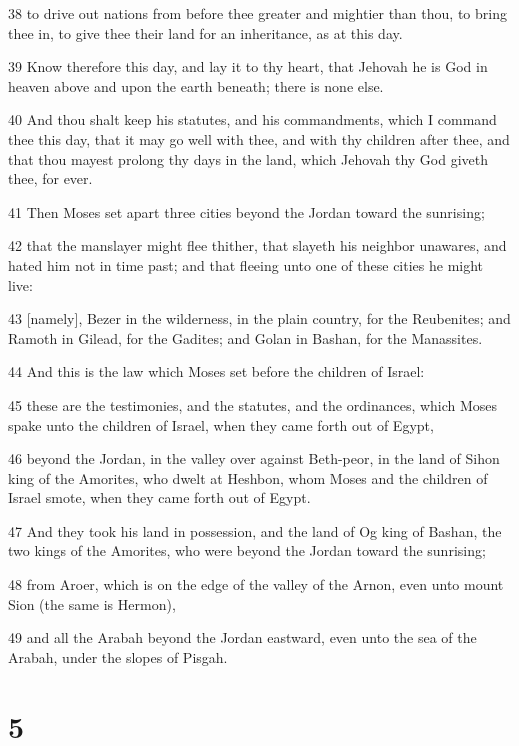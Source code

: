 \par 38 to drive out nations from before thee greater and mightier than thou, to bring thee in, to give thee their land for an inheritance, as at this day.
\par 39 Know therefore this day, and lay it to thy heart, that Jehovah he is God in heaven above and upon the earth beneath; there is none else.
\par 40 And thou shalt keep his statutes, and his commandments, which I command thee this day, that it may go well with thee, and with thy children after thee, and that thou mayest prolong thy days in the land, which Jehovah thy God giveth thee, for ever.
\par 41 Then Moses set apart three cities beyond the Jordan toward the sunrising;
\par 42 that the manslayer might flee thither, that slayeth his neighbor unawares, and hated him not in time past; and that fleeing unto one of these cities he might live:
\par 43 [namely], Bezer in the wilderness, in the plain country, for the Reubenites; and Ramoth in Gilead, for the Gadites; and Golan in Bashan, for the Manassites.
\par 44 And this is the law which Moses set before the children of Israel:
\par 45 these are the testimonies, and the statutes, and the ordinances, which Moses spake unto the children of Israel, when they came forth out of Egypt,
\par 46 beyond the Jordan, in the valley over against Beth-peor, in the land of Sihon king of the Amorites, who dwelt at Heshbon, whom Moses and the children of Israel smote, when they came forth out of Egypt.
\par 47 And they took his land in possession, and the land of Og king of Bashan, the two kings of the Amorites, who were beyond the Jordan toward the sunrising;
\par 48 from Aroer, which is on the edge of the valley of the Arnon, even unto mount Sion (the same is Hermon),
\par 49 and all the Arabah beyond the Jordan eastward, even unto the sea of the Arabah, under the slopes of Pisgah.

\chapter{5}

